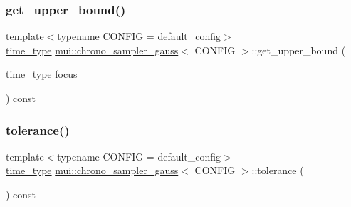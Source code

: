 \mbox{\label{classmui_1_1chrono__sampler__gauss_a8fb552103746c9a1d430dbb6125eadd3}} 
\subsubsection{\texorpdfstring{get\+\_\+upper\+\_\+bound()}{get\_upper\_bound()}}
{\footnotesize\ttfamily template$<$typename C\+O\+N\+F\+IG  = default\+\_\+config$>$ \\
\hyperlink{classmui_1_1chrono__sampler__gauss_accb8778472734fd419da15b26e087a41}{time\+\_\+type} \hyperlink{classmui_1_1chrono__sampler__gauss}{mui\+::chrono\+\_\+sampler\+\_\+gauss}$<$ C\+O\+N\+F\+IG $>$\+::get\+\_\+upper\+\_\+bound (\begin{DoxyParamCaption}\item[{\hyperlink{classmui_1_1chrono__sampler__gauss_accb8778472734fd419da15b26e087a41}{time\+\_\+type}}]{focus }\end{DoxyParamCaption}) const\hspace{0.3cm}{\ttfamily [inline]}}

\mbox{\label{classmui_1_1chrono__sampler__gauss_ad19e8fc5d18b5568ab4c8f52fe518336}} 
\subsubsection{\texorpdfstring{tolerance()}{tolerance()}}
{\footnotesize\ttfamily template$<$typename C\+O\+N\+F\+IG  = default\+\_\+config$>$ \\
\hyperlink{classmui_1_1chrono__sampler__gauss_accb8778472734fd419da15b26e087a41}{time\+\_\+type} \hyperlink{classmui_1_1chrono__sampler__gauss}{mui\+::chrono\+\_\+sampler\+\_\+gauss}$<$ C\+O\+N\+F\+IG $>$\+::tolerance (\begin{DoxyParamCaption}{ }\end{DoxyParamCaption}) const\hspace{0.3cm}{\ttfamily [inline]}}



